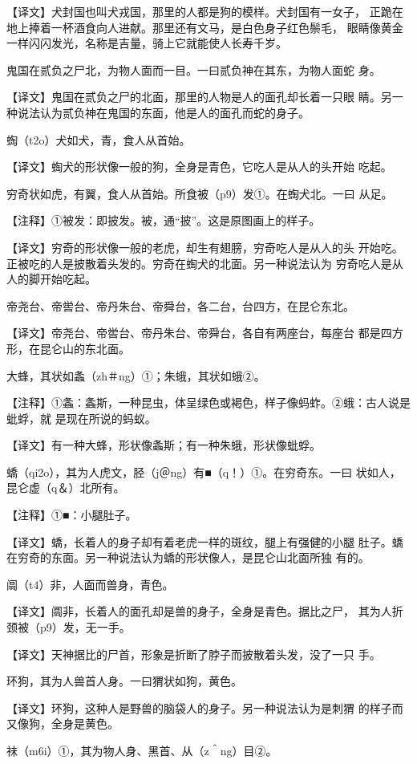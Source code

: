 \documentclass[a4paper,12pt,UTF8,twoside]{ctexbook}
\begin{document}
【译文】犬封国也叫犬戎国，那里的人都是狗的模样。犬封国有一女子， 正跪在地上捧着一杯酒食向人进献。那里还有文马，是白色身子红色鬃毛， 眼睛像黄金一样闪闪发光，名称是吉量，骑上它就能使人长寿千岁。

鬼国在贰负之尸北，为物人面而一目。一曰贰负神在其东，为物人面蛇 身。

【译文】鬼国在贰负之尸的北面，那里的人物是人的面孔却长着一只眼 睛。另一种说法认为贰负神在鬼国的东面，他是人的面孔而蛇的身子。

蜪（t2o）犬如犬，青，食人从首始。

【译文】蜪犬的形状像一般的狗，全身是青色，它吃人是从人的头开始 吃起。

穷奇状如虎，有翼，食人从首始。所食被（p9）发①。在蜪犬北。一曰 从足。

【注释】①被发：即披发。被，通“披”。这是原图画上的样子。

【译文】穷奇的形状像一般的老虎，却生有翅膀，穷奇吃人是从人的头 开始吃。正被吃的人是披散着头发的。穷奇在蜪犬的北面。另一种说法认为 穷奇吃人是从人的脚开始吃起。

帝尧台、帝喾台、帝丹朱台、帝舜台，各二台，台四方，在昆仑东北。

【译文】帝尧台、帝喾台、帝丹朱台、帝舜台，各自有两座台，每座台 都是四方形，在昆仑山的东北面。

大蜂，其状如螽（zh＃ng）①；朱蛾，其状如蛾②。

【注释】①螽：螽斯，一种昆虫，体呈绿色或褐色，样子像蚂蚱。②蛾：古人说是蚍蜉，就 是现在所说的蚂蚁。

【译文】有一种大蜂，形状像螽斯；有一种朱蛾，形状像蚍蜉。

蟜（qi2o），其为人虎文，胫（j＠ng）有■（q！）①。在穷奇东。一曰 状如人，昆仑虚（q＆）北所有。

【注释】①■：小腿肚子。

【译文】蟜，长着人的身子却有着老虎一样的斑纹，腿上有强健的小腿 肚子。蟜在穷奇的东面。另一种说法认为蟜的形状像人，是昆仑山北面所独 有的。

阘（t4）非，人面而兽身，青色。

【译文】阘非，长着人的面孔却是兽的身子，全身是青色。据比之尸， 其为人折颈被（p9）发，无一手。

【译文】天神据比的尸首，形象是折断了脖子而披散着头发，没了一只 手。

环狗，其为人兽首人身。一曰猬状如狗，黄色。

【译文】环狗，这种人是野兽的脑袋人的身子。另一种说法认为是刺猬 的样子而又像狗，全身是黄色。

祙（m6i）①，其为物人身、黑首、从（z＾ng）目②。
\end{document}
